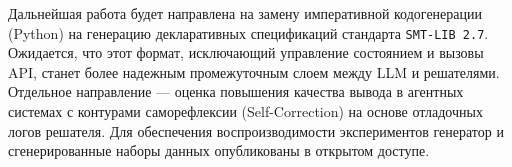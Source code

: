 Дальнейшая работа будет направлена на замену императивной кодогенерации (Python) на генерацию декларативных спецификаций стандарта \texttt{SMT-LIB 2.7}. Ожидается, что этот формат, исключающий управление состоянием и вызовы API, станет более надежным промежуточным слоем между LLM и решателями. Отдельное направление — оценка повышения качества вывода в агентных системах с контурами саморефлексии (Self-Correction) на основе отладочных логов решателя. 
Для обеспечения воспроизводимости экспериментов генератор и сгенерированные наборы данных опубликованы в открытом доступе.
